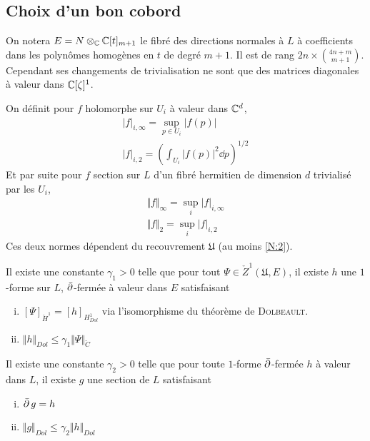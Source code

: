 \documentclass[a4paper,11pt,draft,makeidx,twocolumn]{amsart}
\begin{document}
\subsection{Choix d'un bon cobord}
On notera $E = N \otimes_{\mathbb{C}} \mathbb{C}[t]_{m+1}$ le fibré des directions normales à $L$ à coefficients dans les polynômes homogènes en $t$ de degré $m+1$. Il est de rang $2n \times {4n+m\choose m+1}$. Cependant ses changements de trivialisation ne sont que des matrices diagonales à valeur dans $\mathbb{C}[\zeta]^1$.

On définit pour $f$ holomorphe sur $U_i$ à valeur dans $\mathbb{C}^d$, 
\begin{subequations}\label{Ni}
\begin{gather}
 \vert f \vert_{i,\infty} = \sup_{p \in U_i} | f(p) |\label{Ni:inf}\\
 \vert f \vert_{i,2} = \left(\int_{U_i} |f(p)|^2 \dd p\right)^{1/2}\label{Ni:2}
\end{gather}
\end{subequations}
Et par suite pour $f$ section sur $L$ d'un fibré hermitien de dimension $d$ trivialisé par les $U_i$,
\begin{subequations}\label{N}
\begin{gather}
\Vert f \Vert_{\infty} = \sup_i  \vert f \vert_{i,\infty}\label{N:inf}\\
\Vert f \Vert_{2} = \sup_i  \vert f \vert_{i,2} \label{N:2}
\end{gather}
\end{subequations}
Ces deux normes dépendent du recouvrement $\mathfrak{U}$ (au moins \eqref{N:2}).

\begin{lem}
Il existe une constante $\gamma_1>0$ telle que pour tout $\Psi \in \check{Z}^1(\mathfrak{U}, E)$, il existe $h$ une $1$-forme sur $L$, $\operatorname{\bar{\partial}}$-fermée à valeur dans $E$ satisfaisant
\begin{enumerate}[(i)]
\item $[\Psi]_{\check{H}^1} = [h]_{H^1_{Dol}}$ via l'isomorphisme du théorème de \textsc{Dolbeault}.
\item $\Vert h \Vert_{Dol} \leq \gamma_1 \Vert \Psi \Vert_{\check{C}}$
\end{enumerate}
\end{lem}

\begin{lem}
Il existe une constante $\gamma_2 >0$ telle que pour toute $1$-forme $\operatorname{\bar{\partial}}$-fermée $h$ à valeur dans $L$, il existe $g$ une section de $L$ satisfaisant
\begin{enumerate}[(i)]
\item $\operatorname{\bar{\partial}} g = h$
\item $\Vert g \Vert_{Dol} \leq \gamma_2 \Vert h \Vert_{Dol}$
\end{enumerate}
\end{lem}
\end{document}
